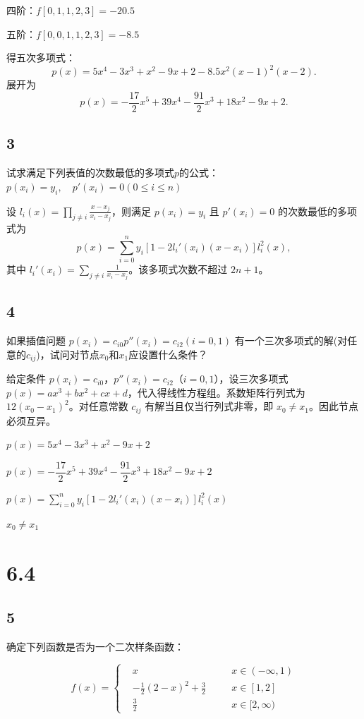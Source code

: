 \documentclass{article}
\begin{document}
四阶：\(f[0,1,1,2,3]=-20.5\)

五阶：\(f[0,0,1,1,2,3]=-8.5\)

得五次多项式：
\[
p(x)=5x^4-3x^3+x^2-9x+2-8.5x^2(x-1)^2(x-2).
\]
展开为
\[
p(x)=-\frac{17}{2}x^5+39x^4-\frac{91}{2}x^3+18x^2-9x+2.
\]

\subsection*{3}
试求满足下列表值的次数最低的多项式$p$的公式：
$p(x_i)=y_i,\quad p'(x_i)=0 (0\leqslant i\leqslant n)$

设 \(l_i(x)=\prod_{j\neq i}\frac{x-x_j}{x_i-x_j}\)，则满足 \(p(x_i)=y_i\) 且 \(p'(x_i)=0\) 的次数最低的多项式为
\[
p(x)=\sum_{i=0}^n y_i\left[1-2l_i'(x_i)(x-x_i)\right]l_i^2(x),
\]
其中 \(l_i'(x_i)=\sum_{j\neq i}\frac{1}{x_i-x_j}\)。该多项式次数不超过 \(2n+1\)。

\subsection*{4}
如果插值问题 
$p(x_i)=c_{i0} p''(x_i) = c_{i2} (i=0,1)$
有一个三次多项式的解(对任意的$c_{ij}$)，试问对节点$x_0$和$x_1$应设置什么条件？


给定条件 \(p(x_i)=c_{i0}\)，\(p''(x_i)=c_{i2}\)（\(i=0,1\)），设三次多项式 \(p(x)=ax^3+bx^2+cx+d\)，代入得线性方程组。系数矩阵行列式为 \(12(x_0-x_1)^2\)。对任意常数 \(c_{ij}\) 有解当且仅当行列式非零，即 \(x_0\neq x_1\)。因此节点必须互异。

\(p(x)=5x^4-3x^3+x^2-9x+2\) \quad

\(p(x)=-\dfrac{17}{2}x^5+39x^4-\dfrac{91}{2}x^3+18x^2-9x+2\) \quad

\(p(x)=\sum_{i=0}^n y_i\left[1-2l_i'(x_i)(x-x_i)\right]l_i^2(x)\) \quad

\(x_0\neq x_1\)

\section*{6.4}

\subsection*{5}
确定下列函数是否为一个二次样条函数：

$$ f(x)=\left\{
\begin{aligned}
&x &\quad & x\in (-\infty, 1)\\
&-\frac{1}{2}(2-x)^2 + \frac{3}{2}& \quad & x\in [1,2] \\
&\frac{3}{2}&\quad & x\in [2,\infty)
\end{aligned}
\right.
$$
\end{document}
